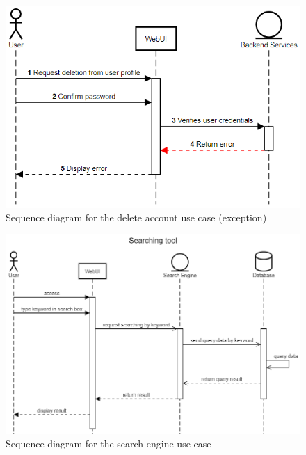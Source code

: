 \documentclass[a4paper]{article}
\begin{document}
\begin{figure}[H]
  \centering
  \includegraphics[width=1.0\textwidth]{delete_account (exception).png}
  \caption{Sequence diagram for the delete account use case (exception)}
  \label{fig:fig19}
\end{figure}

\begin{figure}[H]
  \centering
  \includegraphics[width=1.0\textwidth]{Searching tool.png}
  \caption{Sequence diagram for the search engine use case}
  \label{fig:fig20}
\end{figure}
\end{document}
